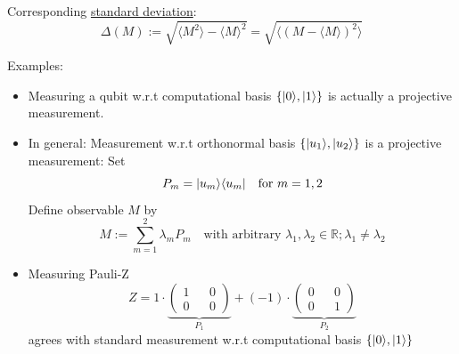 Corresponding \underline{standard deviation}:
\begin{equation}
   \Delta(M) := \sqrt{\langle M^2 \rangle - \langle M \rangle^2} 
        = \sqrt{\langle (M - \langle M \rangle)^2 \rangle}
\end{equation}

Examples:
\begin{itemize}
    \item Measuring a qubit w.r.t computational basis $\{ \lvert0\rangle, \lvert1\rangle \}$ is actually a projective measurement.
    \item In general: Measurement w.r.t orthonormal basis $\{\lvert u_1\rangle, \lvert u_2\rangle\}$ is a projective measurement: Set 
        \begin{equation*}
            P_m = \lvert u_m\rangle \langle u_m\rvert \quad \text{for } m = 1, 2 
        \end{equation*}
        Define observable $M$ by 
        \begin{equation*}
            M := \sum_{m=1}^2 \lambda_m P_m \quad \text{with arbitrary } 
                \lambda_1, \lambda_2 \in \mathbb{R}; \lambda_1 \neq \lambda_2
        \end{equation*}
    \item Measuring Pauli-Z
    \begin{equation*}
        Z =  1 \cdot \underbrace{\begin{pmatrix*}
            1 && 0 \\
            0 && 0
        \end{pmatrix*}}_{P_1} + (-1) \cdot \underbrace{\begin{pmatrix*}
            0 && 0 \\
            0 && 1
        \end{pmatrix*}}_{P_2}
    \end{equation*}
    agrees with standard measurement w.r.t computational basis $\{ \lvert0\rangle, \lvert1\rangle \}$
\end{itemize}

